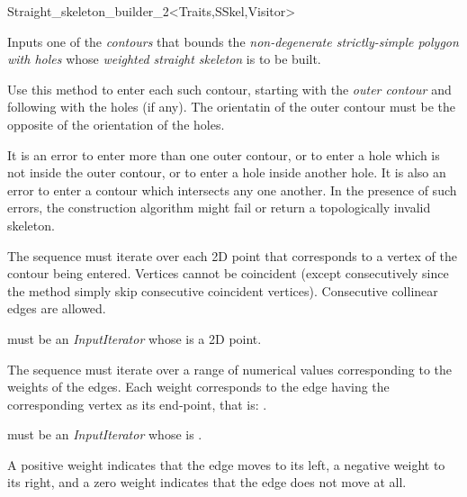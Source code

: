 \begin{ccRefClass}{Straight_skeleton_builder_2<Traits,SSkel,Visitor>}
{Inputs one of the \textit{contours} that bounds the \textit{non-degenerate strictly-simple polygon with holes} whose \textit{weighted straight skeleton} is to be built. 

Use this method to enter each such contour, starting with the \textit{outer contour} and following with the holes (if any). The orientatin of the outer contour must be the opposite of the orientation of the holes.

It is an error to enter more than one outer contour, or to enter a hole which is not inside the outer contour, or to enter a hole inside another hole. It is also an error to enter a contour
which intersects any one another. In the presence of such errors, the construction algorithm might fail or return a topologically invalid skeleton.

The sequence \ccc{[aPBegin,aPEnd)} must iterate over each 2D point that corresponds to a vertex of the contour being entered. Vertices cannot be coincident (except consecutively since the method simply skip consecutive coincident vertices). Consecutive collinear edges are allowed.

 must be an \textit{InputIterator} whose  is a 2D point.

The sequence \ccc{[aWBegin,aWEnd)} must iterate over a range of numerical values corresponding to the weights of the edges.
Each weight  corresponds to the edge having the corresponding vertex as its end-point, that is: .

 must be an \textit{InputIterator} whose  is .

A positive weight indicates that the edge moves to its left, a negative weight to its right, and a zero weight indicates that the edge does not move at all. 

}
\end{ccRefClass}

